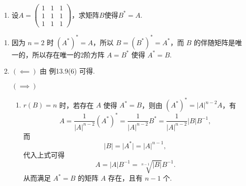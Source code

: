 \begin{exercise}
\begin{exgroup}
\begin{enumerate}
            \item 设$A=\begin{pmatrix}
                          1 & 1 & 1 \\ 1 & 1 & 1 \\ 1 & 1 & 1
                      \end{pmatrix}$，求矩阵$B$使得$B^*=A$.
        \end{enumerate}
        \begin{answer}
            \begin{enumerate}
                \item 因为 $n=2$ 时 $(A^*)^* = A$，所以 $B = (B^*)^* = A^*$，而 $B$ 的伴随矩阵是唯一的，所以存在唯一的2阶方阵 $A = B^*$ 使得 $A^* = B$.

                \item $(\impliedby)$ 由 {例13.9(6)} 可得. %

                      $(\implies)$ \begin{enumerate}
                          \item $r(B) = n$ 时，若存在 $A$ 使得 $A^* = B$，则由 $(A^*)^* = \lvert A \rvert^{n-2}A$，有
                                \[A = \dfrac{1}{\lvert A \rvert^{n-2}}(A^*)^* = \dfrac{1}{\lvert A \rvert^{n-2}}B^* = \dfrac{1}{\lvert A \rvert^{n-2}}\lvert B \rvert B^{-1},\]
                                而
                                \[\lvert B \rvert = \lvert A^* \rvert = \lvert A \rvert^{n-1},\]
                                代入上式可得
                                \[A = \lvert A \rvert B^{-1} = \sqrt[n-1]{\lvert B \rvert} B^{-1}.\]
                                从而满足 $A^* = B$ 的矩阵 $A$ 存在，且有 $n-1$ 个.


\end{enumerate}
\end{enumerate}
\end{answer}
\end{exgroup}
\end{exercise}
